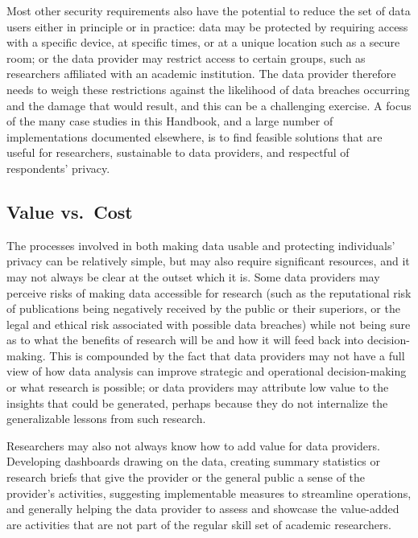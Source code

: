 Most other security requirements also have the potential to reduce the set of data users either in principle or in practice: data may be protected by requiring access with a specific device, at specific times, or at a unique location such as a secure room; or the data provider may restrict access to certain groups, such as researchers affiliated with an academic institution. The data provider therefore needs to weigh these restrictions against the likelihood of data breaches occurring and the damage that would result, and this can be a challenging exercise. A focus of the many case studies in this Handbook, and a large number of implementations documented elsewhere, is to find feasible solutions that are useful for researchers, sustainable to data providers, and respectful of respondents' privacy.

\hypertarget{value-vs.-cost}{%
\subsection{Value vs.~Cost}\label{value-vs.-cost}}

The processes involved in both making data usable and protecting individuals' privacy can be relatively simple, but may also require significant resources, and it may not always be clear at the outset which it is. Some data providers may perceive risks of making data accessible for research (such as the reputational risk of publications being negatively received by the public or their superiors, or the legal and ethical risk associated with possible data breaches) while not being sure as to what the benefits of research will be and how it will feed back into decision-making. This is compounded by the fact that data providers may not have a full view of how data analysis can improve strategic and operational decision-making or what research is possible; or data providers may attribute low value to the insights that could be generated, perhaps because they do not internalize the generalizable lessons from such research.

Researchers may also not always know how to add value for data providers. Developing dashboards drawing on the data, creating summary statistics or research briefs that give the provider or the general public a sense of the provider's activities, suggesting implementable measures to streamline operations, and generally helping the data provider to assess and showcase the value-added are activities that are not part of the regular skill set of academic researchers.

